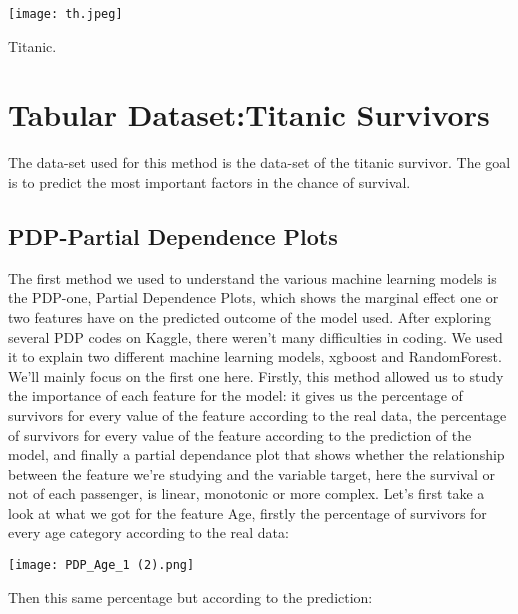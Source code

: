 \documentclass[sigplan,screen]{acmart}
\begin{document}
\begin{teaserfigure}
  \texttt{[image: th.jpeg]}
  \caption{Titanic.}
  \label{fig:teaser}
\end{teaserfigure}


\maketitle

\section{Tabular Dataset:Titanic Survivors}
\large
The data-set used for this method is the data-set of the titanic survivor. The goal is to predict the most important factors in the chance of survival.
\subsection{PDP-Partial Dependence Plots}
\large
The first method we used to understand the various machine learning models is the PDP-one, Partial Dependence Plots, which shows the marginal effect one or two features have on the predicted outcome of the model used. After exploring several PDP codes on Kaggle, there weren't many difficulties in coding.
We used it to explain two different machine learning models, xgboost and RandomForest. We'll mainly focus on the first one here.
Firstly, this method allowed us to study the importance of each feature for the model: it gives us the percentage of survivors for every value of the feature according to the real data, the percentage of survivors for every value of the feature according to the prediction of the model, and finally a partial dependance plot that shows whether the relationship between the feature we're studying and the variable target, here the survival or not of each passenger, is linear, monotonic or more complex.
Let's first take a look at what we got for the feature Age, firstly the percentage of survivors for every age category according to the real data:

      \texttt{[image: PDP\_Age\_1 (2).png]}

Then this same percentage but according to the prediction:
\end{document}
